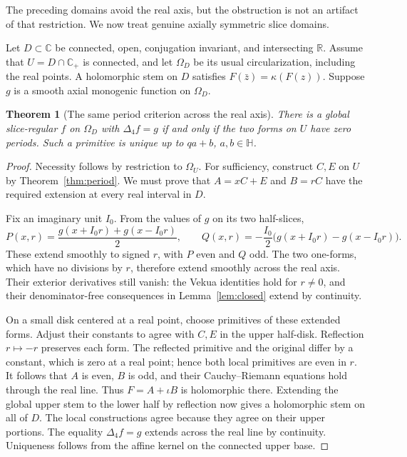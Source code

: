 \documentclass[11pt,a4paper]{article}
\numberwithin{equation}{section}
\newtheorem{theorem}{Theorem}[section]
\theoremstyle{definition}
\theoremstyle{remark}
\newcommand{\R}{\mathbb R}
\newcommand{\C}{\mathbb C}
\newcommand{\HH}{\mathbb H}
\newcommand{\Cp}{\C_+}
\newcommand{\lap}{\Delta_4}
\begin{document}
The preceding domains avoid the real axis, but the obstruction is not an
artifact of that restriction. We now treat genuine axially symmetric slice
domains.

Let $D\subset\C$ be connected, open, conjugation invariant, and intersecting
$\R$. Assume that $U=D\cap\Cp$ is connected, and let $\Omega_D$ be its
usual circularization, including the real points. A holomorphic stem on $D$
satisfies $F(\bar z)=\kappa(F(z))$. Suppose $g$ is a smooth axial monogenic
function on $\Omega_D$.

\begin{theorem}[The same period criterion across the real axis]
\label{thm:crossreal}
There is a global slice-regular $f$ on $\Omega_D$ with $\lap f=g$ if and
only if the two forms on $U$ have zero periods. Such a primitive is unique
up to $qa+b$, $a,b\in\HH$.
\end{theorem}
\begin{proof}
Necessity follows by restriction to $\Omega_U$. For sufficiency, construct
$C,E$ on $U$ by Theorem~\ref{thm:period}. We must prove that
$A=xC+E$ and $B=rC$ have the required extension at every real interval in $D$.

Fix an imaginary unit $I_0$. From the values of $g$ on its two half-slices,
\[
 P(x,r)=\frac{g(x+I_0r)+g(x-I_0r)}2,\qquad
 Q(x,r)=-\frac{I_0}{2}\bigl(g(x+I_0r)-g(x-I_0r)\bigr).
\]
These extend smoothly to signed $r$, with $P$ even and $Q$ odd. The two
one-forms, which have no divisions by $r$, therefore extend smoothly across
the real axis. Their exterior derivatives still vanish: the Vekua identities
hold for $r\ne0$, and their denominator-free consequences in
Lemma~\ref{lem:closed} extend by continuity.

On a small disk centered at a real point, choose primitives of these extended
forms. Adjust their constants to agree with $C,E$ in the upper half-disk.
Reflection $r\mapsto-r$ preserves each form. The reflected primitive and
the original differ by a constant, which is zero at a real point; hence both
local primitives are even in $r$. It follows that $A$ is even, $B$ is odd,
and their Cauchy--Riemann equations hold through the real line. Thus
$F=A+\iota B$ is holomorphic there. Extending the global upper stem to the
lower half by reflection now gives a holomorphic stem on all of $D$.
The local constructions agree because they agree on their upper portions.
The equality $\lap f=g$ extends across the real line by continuity.
Uniqueness follows from the affine kernel on the connected upper base.
\end{proof}
\end{document}
